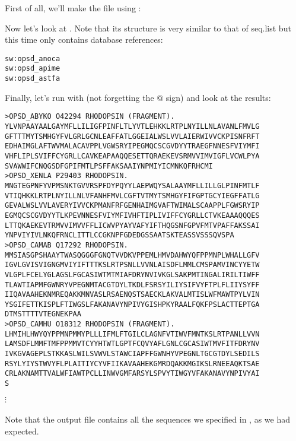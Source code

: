\documentclass[12pt]{report}
\begin{document}
First of all, we'll make the file  using
:

\unix{}

Now let's look at . Note that its structure is very
similar to that of seq.list but this time only contains database
references:

\unix{} 
\begin{verbatim}
sw:opsd_anoca
sw:opsd_apime
sw:opsd_astfa
\end{verbatim}

Finally, let's run  with  (not forgetting the @
sign) and look at the results:

\unix{}

\unix{}
\begin{verbatim}
>OPSD_ABYKO O42294 RHODOPSIN (FRAGMENT).
YLVNPAAYAALGAYMFLLILIGFPINFLTLYVTLEHKKLRTPLNYILLNLAVANLFMVLG
GFTTTMYTSMHGYFVLGRLGCNLEAFFATLGGEIALWSLVVLAIERWIVVCKPISNFRFT
EDHAIMGLAFTWVMALACAVPPLVGWSRYIPEGMQCSCGVDYYTRAEGFNNESFVIYMFI
VHFLIPLSVIFFCYGRLLCAVKEAPAAQQESETTQRAEKEVSRMVVIMVIGFLVCWLPYA
SVAWWIFCNQGSDFGPIFMTLPSFFAKSAAIYNPMIYICMNKQFRHCMI
>OPSD_XENLA P29403 RHODOPSIN.
MNGTEGPNFYVPMSNKTGVVRSPFDYPQYYLAEPWQYSALAAYMFLLILLGLPINFMTLF
VTIQHKKLRTPLNYILLNLVFANHFMVLCGFTVTMYTSMHGYFIFGPTGCYIEGFFATLG
GEVALWSLVVLAVERYIVVCKPMANFRFGENHAIMGVAFTWIMALSCAAPPLFGWSRYIP
EGMQCSCGVDYYTLKPEVNNESFVIYMFIVHFTIPLIVIFFCYGRLLCTVKEAAAQQQES
LTTQKAEKEVTRMVVIMVVFFLICWVPYAYVAFYIFTHQGSNFGPVFMTVPAFFAKSSAI
YNPVIYIVLNKQFRNCLITTLCCGKNPFGDEDGSSAATSKTEASSVSSSQVSPA
>OPSD_CAMAB Q17292 RHODOPSIN.
MMSIASGPSHAAYTWASQGGGFGNQTVVDKVPPEMLHMVDAHWYQFPPMNPLWHALLGFV
IGVLGVISVIGNGMVIYIFTTTKSLRTPSNLLVVNLAISDFLMMLCMSPAMVINCYYETW
VLGPLFCELYGLAGSLFGCASIWTMTMIAFDRYNVIVKGLSAKPMTINGALIRILTIWFF
TLAWTIAPMFGWNRYVPEGNMTACGTDYLTKDLFSRSYILIYSIFVYFTPLFLIIYSYFF
IIQAVAAHEKNMREQAKKMNVASLRSAENQSTSAECKLAKVALMTISLWFMAWTPYLVIN
YSGIFETTKISPLFTIWGSLFAKANAVYNPIVYGISHPKYRAALFQKFPSLACTTEPTGA
DTMSTTTTVTEGNEKPAA
>OPSD_CAMHU O18312 RHODOPSIN (FRAGMENT).
LHMIHLHWYQYPPMNPMMYPLLLIFMLFTGILCLAGNFVTIWVFMNTKSLRTPANLLVVN
LAMSDFLMMFTMFPPMMVTCYYHTWTLGPTFCQVYAFLGNLCGCASIWTMVFITFDRYNV
IVKGVAGEPLSTKKASLWILSVWVLSTAWCIAPFFGWNHYVPEGNLTGCGTDYLSEDILS
RSYLYIYSTWVYFLPLAITIYCYVFIIKAVAAHEKGMRDQAKKMGIKSLRNEEAQKTSAE
CRLAKNAMTTVALWFIAWTPCLLINWVGMFARSYLSPVYTIWGYVFAKANAVYNPIVYAI
S
\end{verbatim}
$\vdots$
\\
\\
\noindent Note that the output file contains all the sequences we specified in
, as we had expected.
\end{document}

